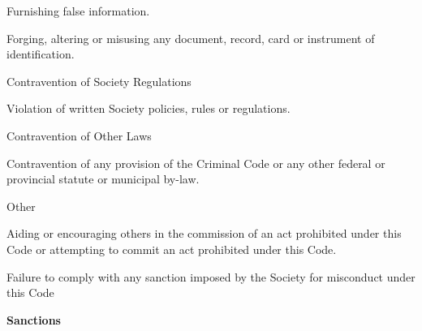\begin{longenum}[ label*=\arabic*., align=left]
\begin{longenum}[ label*=\arabic*., align=left]
\begin{longenum}[ label*=\arabic*., align=left]
                        \item Furnishing false information.
                        \item Forging,   altering   or   misusing   any   document,   record,   card   or   instrument   of identification.
                  \end{longenum}

                  \item Contravention of Society Regulations

                  \begin{longenum}[ label*=\arabic*., align=left]

                        \item  Violation of written Society policies, rules or regulations.
                  \end{longenum}
                  \item Contravention of Other Laws

                  \begin{longenum}[ label*=\arabic*., align=left]

                        \item Contravention of any provision of the Criminal Code or any other federal or provincial statute or municipal by-law.
                  \end{longenum}
                  \item Other

                  \begin{longenum}[ label*=\arabic*., align=left]

                        \item Aiding or encouraging others in the commission of an act prohibited under this Code or attempting to commit an act prohibited under this Code.
                        \item Failure  to  comply  with  any  sanction  imposed  by  the Society  for  misconduct  under  this Code
                  \end{longenum}
  \end{longenum}
  
  \item \textbf{Sanctions}
  

\end{longenum}

